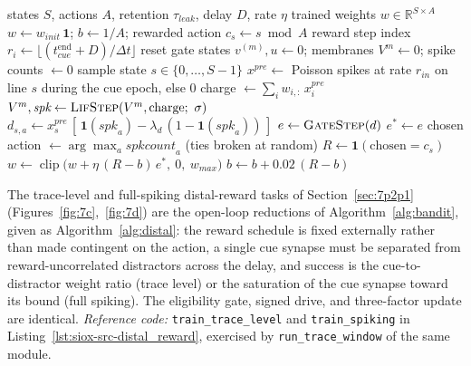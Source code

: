 \begin{algorithm}[htbp!]
\caption{Three-factor closed-loop contextual bandit (one seed).}
\label{alg:bandit}
\begin{algorithmic}[1]
\Require states $S$, actions $A$, retention $\tau_{leak}$, delay $D$, rate $\eta$
\Ensure trained weights $w \in \mathbb{R}^{S\times A}$
\State $w \gets w_{init}\,\mathbf{1}$; \quad $b \gets 1/A$; \quad rewarded action $c_s \gets s \bmod A$
\State reward step index $r_i \gets \lfloor (t_{cue}^{\text{end}} + D)/\Delta t \rfloor$
    \State reset gate states $v^{(m)}, u \gets 0$; \quad membranes $V^m \gets 0$; \quad spike counts $\gets 0$
    \State sample state $s \in \{0,\dots,S-1\}$
        \State $x^{pre} \gets$ Poisson spikes at rate $r_{in}$ on line $s$ during the cue epoch, else $0$
        \State charge $\gets \sum_i w_{i,:}\,x^{pre}_i$ 
        \State $V^m, \textit{spk} \gets \textsc{LifStep}(V^m, \text{charge};\ \sigma)$ 
        \State $d_{s,a} \gets x^{pre}_s\,[\,\mathbf{1}(\textit{spk}_a) - \lambda_d\,(1-\mathbf{1}(\textit{spk}_a))\,]$ 
        \State $e \gets \textsc{GateStep}(d)$ 
         \quad $e^{\ast} \gets e$ 
        \EndIf
    \EndFor
    \State chosen action $\gets \arg\max_a \textit{spkcount}_a$ (ties broken at random)
    \State $R \gets \mathbf{1}(\text{chosen} = c_s)$
    \State $w \gets \operatorname{clip}\!\big(w + \eta\,(R-b)\,e^{\ast},\ 0,\ w_{max}\big)$ 
    \State $b \gets b + 0.02\,(R-b)$
\EndFor
\end{algorithmic}
\end{algorithm}

\noindent The trace-level and full-spiking distal-reward tasks of
Section~\ref{sec:7p2p1} (Figures~\ref{fig:7c},~\ref{fig:7d}) are the open-loop
reductions of Algorithm~\ref{alg:bandit}, given as Algorithm~\ref{alg:distal}: the reward
schedule is fixed externally rather than made contingent on the action, a single cue
synapse must be separated from reward-uncorrelated distractors across the delay, and
success is the cue-to-distractor weight ratio (trace level) or the saturation of the cue
synapse toward its bound (full spiking). The eligibility gate, signed drive, and
three-factor update are identical. \emph{Reference code:} \texttt{train\_trace\_level}
and \texttt{train\_spiking} in Listing~\ref{lst:siox-src-distal_reward}, exercised by
\texttt{run\_trace\_window} of the same module.

